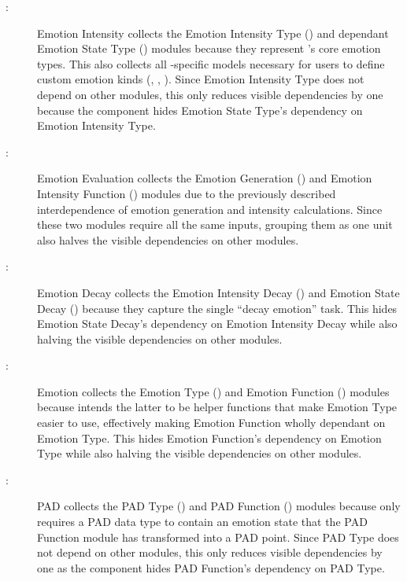 \begin{description}

    \item [ \mthecpnum \label{cpIntensity}:] Emotion
    Intensity collects the Emotion Intensity Type (\textbf{})
    and dependant Emotion State Type (\textbf{}) modules
    because they represent \progname{}'s core emotion types. This also collects
    all \progname{}-specific models necessary for users to define custom
    emotion kinds (, ,
    ). Since Emotion Intensity Type does not depend
    on other modules, this only reduces visible dependencies by one because the
    component hides Emotion State Type's dependency on Emotion Intensity Type.

    \item [ \mthecpnum \label{cpGenerate}:] Emotion
    Evaluation collects the Emotion Generation (\textbf{}) and
    Emotion Intensity Function (\textbf{}) modules due to
    the previously described interdependence of emotion generation and
    intensity calculations. Since these two modules require all the same
    inputs, grouping them as one unit also halves the visible dependencies on
    other modules.

    \item [ \mthecpnum \label{cpDecay}:] Emotion Decay
    collects the Emotion Intensity Decay (\textbf{}) and Emotion
    State Decay (\textbf{}) because they capture the single
    ``decay emotion'' task. This hides Emotion State Decay's dependency on
    Emotion Intensity Decay while also halving the visible dependencies on other
    modules.

    \item [ \mthecpnum \label{cpEmotion}:] Emotion
    collects the Emotion Type (\textbf{}) and Emotion
    Function (\textbf{}) modules because \progname{} intends
    the latter to be helper functions that make Emotion Type easier to use,
    effectively making Emotion Function wholly dependant on Emotion Type. This
    hides Emotion Function's dependency on Emotion Type while also halving the
    visible dependencies on other modules.

    \item [ \mthecpnum \label{cpPAD}:] PAD collects the
    PAD Type (\textbf{}) and PAD Function
    (\textbf{}) modules because \progname{} only requires a PAD
    data type to contain an emotion state that the PAD Function module has
    transformed into a PAD point. Since PAD Type does not depend on other
    modules, this only reduces visible dependencies by one as the component
    hides PAD Function's dependency on PAD Type.


\end{description}
